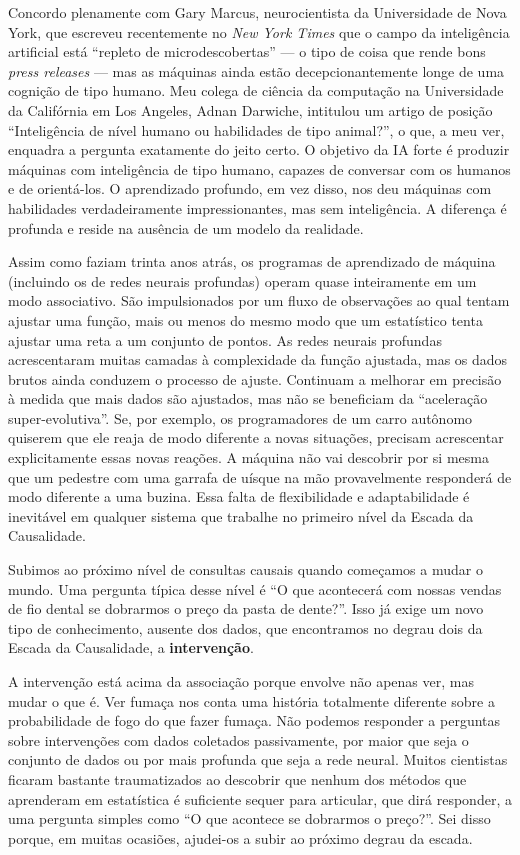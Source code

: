 \documentclass[11pt,a5paper,twoside]{book}
\begin{document}
Concordo plenamente com Gary Marcus, neurocientista da Universidade de Nova York, que escreveu recentemente no \textit{New York Times} que o campo da inteligência artificial está “repleto de microdescobertas” — o tipo de coisa que rende bons \textit{press releases} — mas as máquinas ainda estão decepcionantemente longe de uma cognição de tipo humano. Meu colega de ciência da computação na Universidade da Califórnia em Los Angeles, Adnan Darwiche, intitulou um artigo de posição “Inteligência de nível humano ou habilidades de tipo animal?”, o que, a meu ver, enquadra a pergunta exatamente do jeito certo. O objetivo da IA forte é produzir máquinas com inteligência de tipo humano, capazes de conversar com os humanos e de orientá-los. O aprendizado profundo, em vez disso, nos deu máquinas com habilidades verdadeiramente impressionantes, mas sem inteligência. A diferença é profunda e reside na ausência de um modelo da realidade.

Assim como faziam trinta anos atrás, os programas de aprendizado de máquina (incluindo os de redes neurais profundas) operam quase inteiramente em um modo associativo. São impulsionados por um fluxo de observações ao qual tentam ajustar uma função, mais ou menos do mesmo modo que um estatístico tenta ajustar uma reta a um conjunto de pontos. As redes neurais profundas acrescentaram muitas camadas à complexidade da função ajustada, mas os dados brutos ainda conduzem o processo de ajuste. Continuam a melhorar em precisão à medida que mais dados são ajustados, mas não se beneficiam da “aceleração super-evolutiva”. Se, por exemplo, os programadores de um carro autônomo quiserem que ele reaja de modo diferente a novas situações, precisam acrescentar explicitamente essas novas reações. A máquina não vai descobrir por si mesma que um pedestre com uma garrafa de uísque na mão provavelmente responderá de modo diferente a uma buzina. Essa falta de flexibilidade e adaptabilidade é inevitável em qualquer sistema que trabalhe no primeiro nível da Escada da Causalidade.

Subimos ao próximo nível de consultas causais quando começamos a mudar o mundo. Uma pergunta típica desse nível é “O que acontecerá com nossas vendas de fio dental se dobrarmos o preço da pasta de dente?”. Isso já exige um novo tipo de conhecimento, ausente dos dados, que encontramos no degrau dois da Escada da Causalidade, a \textbf{intervenção}.

A intervenção está acima da associação porque envolve não apenas ver, mas mudar o que é. Ver fumaça nos conta uma história totalmente diferente sobre a probabilidade de fogo do que fazer fumaça. Não podemos responder a perguntas sobre intervenções com dados coletados passivamente, por maior que seja o conjunto de dados ou por mais profunda que seja a rede neural. Muitos cientistas ficaram bastante traumatizados ao descobrir que nenhum dos métodos que aprenderam em estatística é suficiente sequer para articular, que dirá responder, a uma pergunta simples como “O que acontece se dobrarmos o preço?”. Sei disso porque, em muitas ocasiões, ajudei-os a subir ao próximo degrau da escada.
\end{document}
